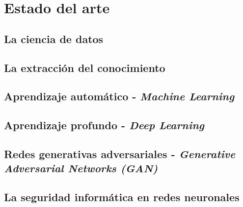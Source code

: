 


\section{Estado del arte}

\subsection{La ciencia de datos}

\subsection{La extracción del conocimiento}

\subsection{Aprendizaje automático - \textit{Machine Learning}}

\subsection{Aprendizaje profundo - \textit{Deep Learning}}

\subsection{Redes generativas adversariales - \textit{Generative Adversarial Networks (GAN)}}

\subsection{La seguridad informática en redes neuronales}

